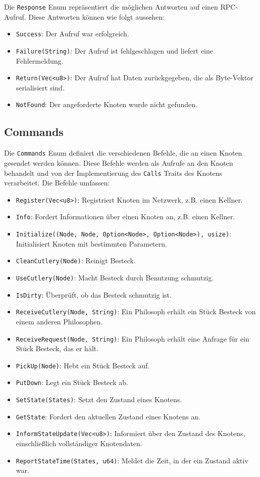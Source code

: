 Die \texttt{Response} Enum repräsentiert die möglichen Antworten auf einen RPC-Aufruf. Diese Antworten können wie folgt aussehen:
\begin{itemize}
    \item \texttt{Success}: Der Aufruf war erfolgreich.
    \item \texttt{Failure(String)}: Der Aufruf ist fehlgeschlagen und liefert eine Fehlermeldung.
    \item \texttt{Return(Vec<u8>)}: Der Aufruf hat Daten zurückgegeben, die als Byte-Vektor serialisiert sind.
    \item \texttt{NotFound}: Der angeforderte Knoten wurde nicht gefunden.
\end{itemize}

\subsection{Commands}

Die \texttt{Commands} Enum definiert die verschiedenen Befehle, die an einen Knoten gesendet werden können. Diese Befehle werden als Aufrufe an den Knoten behandelt und von der Implementierung des \texttt{Calls} Traits des Knotens verarbeitet. Die Befehle umfassen:
\begin{itemize}
    \item \texttt{Register(Vec<u8>)}: Registriert Knoten im Netzwerk, z.B. einen Kellner.
    \item \texttt{Info}: Fordert Informationen über einen Knoten an, z.B. einen Kellner.
    \item \texttt{Initialize((Node, Node, Option<Node>, Option<Node>), usize)}: Initialisiert Knoten mit bestimmten Parametern.
    \item \texttt{CleanCutlery(Node)}: Reinigt Besteck.
    \item \texttt{UseCutlery(Node)}: Macht Besteck durch Benutzung schmutzig.
    \item \texttt{IsDirty}: Überprüft, ob das Besteck schmutzig ist.
    \item \texttt{ReceiveCutlery(Node, String)}: Ein Philosoph erhält ein Stück Besteck von einem anderen Philosophen.
    \item \texttt{ReceiveRequest(Node, String)}: Ein Philosoph erhält eine Anfrage für ein Stück Besteck, das er hält.
    \item \texttt{PickUp(Node)}: Hebt ein Stück Besteck auf.
    \item \texttt{PutDown}: Legt ein Stück Besteck ab.
    \item \texttt{SetState(States)}: Setzt den Zustand eines Knotens.
    \item \texttt{GetState}: Fordert den aktuellen Zustand eines Knotens an.
    \item \texttt{InformStateUpdate(Vec<u8>)}: Informiert über den Zustand des Knotens, einschließlich vollständiger Knotendaten.
    \item \texttt{ReportStateTime(States, u64)}: Meldet die Zeit, in der ein Zustand aktiv war.
\end{itemize}

